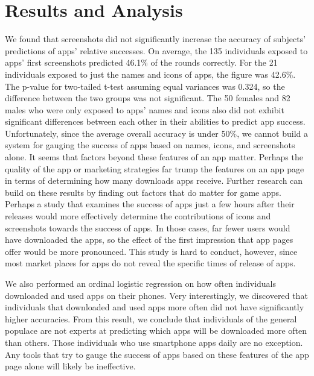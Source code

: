 \section{Results and Analysis}


We found that screenshots did not significantly increase the accuracy of subjects' predictions of apps' relative successes. On average, the 135 individuals exposed to apps' first screenshots predicted 46.1\% of the rounds correctly. For the 21 individuals exposed to just the names and icons of apps, the figure was 42.6\%. The p-value for two-tailed t-test assuming equal variances was 0.324, so the difference between the two groups was not significant. The 50 females and 82 males who were only exposed to apps' names and icons also did not exhibit significant differences between each other in their abilities to predict app success. \\

Unfortunately, since the average overall accuracy is under 50\%, we cannot build a system for gauging the success of apps based on names, icons, and screenshots alone. It seems that factors beyond these features of an app matter. Perhaps the quality of the app or marketing strategies far trump the features on an app page in terms of determining how many downloads apps receive. Further research can build on these results by finding out factors that do matter for game apps. Perhaps a study that examines the success of apps just a few hours after their releases would more effectively determine the contributions of icons and screenshots towards the success of apps. In those cases, far fewer users would have downloaded the apps, so the effect of the first impression that app pages offer would be more pronounced. This study is hard to conduct, however, since most market places for apps do not reveal the specific times of release of apps.

We also performed an ordinal logistic regression on how often individuals downloaded and used apps on their phones. Very interestingly, we discovered that individuals that downloaded and used apps more often did not have significantly higher accuracies. From this result, we conclude that individuals of the general populace are not experts at predicting which apps will be downloaded more often than others. Those individuals who use smartphone apps daily are no exception. Any tools that try to gauge the success of apps based on these features of the app page alone will likely be ineffective. \\
